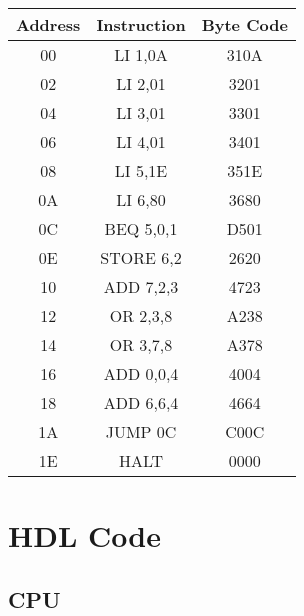 \documentclass{article}
\begin{document}
\vspace{1em}
\begin{tabular}{|c|c|c|}
    \hline
    Address & Instruction & Byte Code \\
    \hline
    00 & LI 1,0A & 310A \\
    02 & LI 2,01 & 3201 \\
    04 & LI 3,01 & 3301 \\
    06 & LI 4,01 & 3401 \\
    08 & LI 5,1E & 351E \\
    0A & LI 6,80 & 3680 \\
    0C & BEQ 5,0,1 & D501 \\
    0E & STORE 6,2 & 2620 \\
    10 & ADD 7,2,3 & 4723 \\
    12 & OR 2,3,8 & A238 \\
    14 & OR 3,7,8 & A378 \\
    16 & ADD 0,0,4 & 4004 \\
    18 & ADD 6,6,4 & 4664 \\
    1A & JUMP 0C & C00C \\
    1E & HALT & 0000 \\
    \hline
\end{tabular}

\raggedright

\section{HDL Code}

\subsection{CPU}
\end{document}
